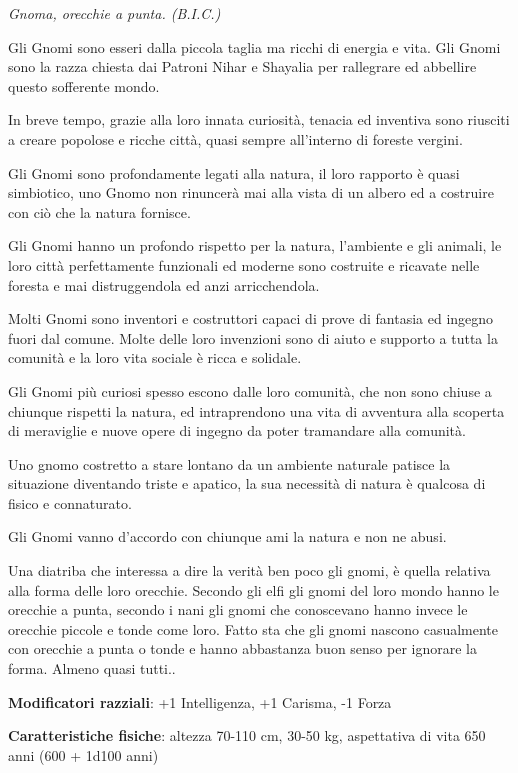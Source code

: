 \begin{multicols}{2}
\begin{center}
\textit{Gnoma, orecchie a punta. (B.I.C.)}
\end{center}

Gli Gnomi sono esseri dalla piccola taglia ma ricchi di energia e vita. Gli Gnomi sono la razza chiesta dai Patroni Nihar e Shayalia per rallegrare ed abbellire questo sofferente mondo.

In breve tempo, grazie alla loro innata curiosità, tenacia ed inventiva sono riusciti a creare popolose e ricche città, quasi sempre all'interno di foreste vergini.

Gli Gnomi sono profondamente legati alla natura, il loro rapporto è quasi simbiotico, uno Gnomo non rinuncerà mai alla vista di un albero ed a costruire con ciò che la natura fornisce.

Gli Gnomi hanno un profondo rispetto per la natura, l'ambiente e gli animali, le loro città perfettamente funzionali ed moderne sono costruite e ricavate nelle foresta e mai distruggendola ed anzi arricchendola.

Molti Gnomi sono inventori e costruttori capaci di prove di fantasia ed ingegno fuori dal comune. Molte delle loro invenzioni sono di aiuto e supporto a tutta la comunità e la loro vita sociale è ricca e solidale.

Gli Gnomi più curiosi spesso escono dalle loro comunità, che non sono chiuse a chiunque rispetti la natura, ed intraprendono una vita di avventura alla scoperta di meraviglie e nuove opere di ingegno da poter tramandare alla comunità.

Uno gnomo costretto a stare lontano da un ambiente naturale patisce la situazione diventando triste e apatico, la sua necessità di natura è qualcosa di fisico e connaturato.

Gli Gnomi vanno d'accordo con chiunque ami la natura e non ne abusi.

Una diatriba che interessa a dire la verità ben poco gli gnomi, è quella relativa alla forma delle loro orecchie. Secondo gli elfi gli gnomi del loro mondo hanno le orecchie a punta, secondo i nani gli gnomi che conoscevano hanno invece le orecchie piccole e tonde come loro. Fatto sta che gli gnomi nascono casualmente con orecchie a punta o tonde e hanno abbastanza buon senso per ignorare la forma. Almeno quasi tutti..

\textbf{Modificatori razziali}: +1 Intelligenza, +1 Carisma, -1 Forza

\textbf{Caratteristiche fisiche}: altezza 70-110 cm, 30-50 kg, aspettativa di vita 650 anni (600 + 1d100 anni)


\end{multicols}
